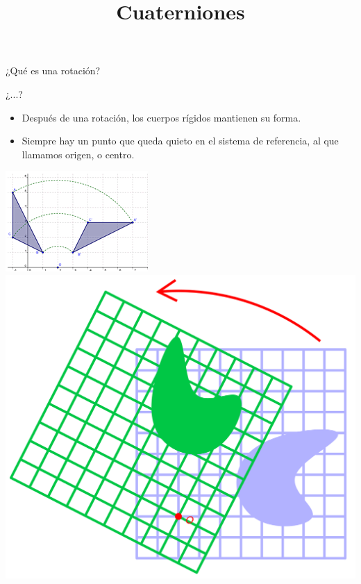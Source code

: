\documentclass[10pt]{beamer}
\title{Cuaterniones}
\begin{document}
\maketitle


\begin{frame}{¿Qué es una rotación?}


¿...?




\begin{itemize}
	\item Después de una rotación, los cuerpos rígidos mantienen su forma. %
	\item Siempre hay un punto que queda quieto en el sistema de referencia, al que llamamos origen, o centro.
\end{itemize}



\includegraphics[scale=0.8]{rigid.png}
\includegraphics[scale=0.11]{fixed.png}

\end{frame}
\end{document}
